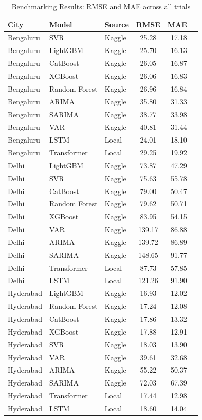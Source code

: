 \documentclass[11pt,a4paper,oneside]{book}
\begin{document}
\begin{table}[H]
    \centering
    \begin{tabular}{lllc rr}
    \toprule
    \textbf{City} & \textbf{Model} & \textbf{Source} & \textbf{RMSE} & \textbf{MAE} \\
    \midrule
    Bengaluru & SVR & Kaggle & 25.28 & 17.18 \\
    Bengaluru & LightGBM & Kaggle & 25.70 & 16.13 \\
    Bengaluru & CatBoost & Kaggle & 26.05 & 16.87 \\
    Bengaluru & XGBoost & Kaggle & 26.06 & 16.83 \\
    Bengaluru & Random Forest & Kaggle & 26.96 & 16.84 \\
    Bengaluru & ARIMA & Kaggle & 35.80 & 31.33 \\
    Bengaluru & SARIMA & Kaggle & 38.77 & 33.98 \\
    Bengaluru & VAR & Kaggle & 40.81 & 31.44 \\
    Bengaluru & LSTM & Local & 24.01 & 18.10 \\
    Bengaluru & Transformer & Local & 29.25 & 19.92 \\
    Delhi & LightGBM & Kaggle & 73.87 & 47.29 \\
    Delhi & SVR & Kaggle & 75.63 & 55.78 \\
    Delhi & CatBoost & Kaggle & 79.00 & 50.47 \\
    Delhi & Random Forest & Kaggle & 79.62 & 50.71 \\
    Delhi & XGBoost & Kaggle & 83.95 & 54.15 \\
    Delhi & VAR & Kaggle & 139.17 & 86.88 \\
    Delhi & ARIMA & Kaggle & 139.72 & 86.89 \\
    Delhi & SARIMA & Kaggle & 148.65 & 91.77 \\
    Delhi & Transformer & Local & 87.73 & 57.85 \\
    Delhi & LSTM & Local & 121.26 & 91.90 \\
    Hyderabad & LightGBM & Kaggle & 16.93 & 12.02 \\
    Hyderabad & Random Forest & Kaggle & 17.24 & 12.08 \\
    Hyderabad & CatBoost & Kaggle & 17.86 & 13.32 \\
    Hyderabad & XGBoost & Kaggle & 17.88 & 12.91 \\
    Hyderabad & SVR & Kaggle & 18.03 & 13.90 \\
    Hyderabad & VAR & Kaggle & 39.61 & 32.68 \\
    Hyderabad & ARIMA & Kaggle & 55.22 & 50.37 \\
    Hyderabad & SARIMA & Kaggle & 72.03 & 67.39 \\
    Hyderabad & Transformer & Local & 17.44 & 12.98 \\
    Hyderabad & LSTM & Local & 18.60 & 14.04 \\
    \bottomrule
    \end{tabular}
    \caption{Benchmarking Results: RMSE and MAE across all trials}
\end{table}
\end{document}
